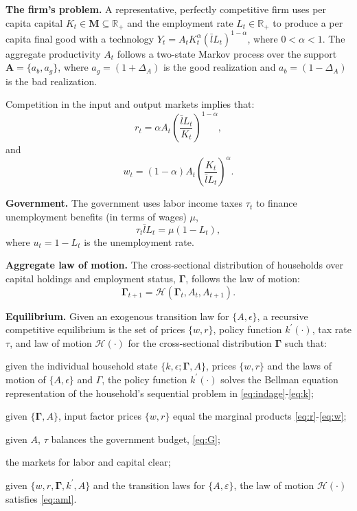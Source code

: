 \documentclass[12pt,american]{article}
\newcommand{\kdis}{\mathbf{\Gamma}}
\newcommand{\Aset}{\mathbf{A}}
\newcommand{\lbar}{\bar{l}}
\newcommand{\Leff}{\lbar L}
\begin{document}
\textbf{The firm's problem.} A representative, perfectly competitive firm uses per capita capital $K_{t}\in\mathbf{M}\subseteq\mathbb{R}_{+}$ and the employment rate $L_{t}\in\mathbb{R}_{+}$ to produce a per capita final good with a technology $Y_{t} = A_{t}K^{\alpha}_{t}(\Leff_{t})^{1-\alpha}$, where $0<\alpha<1$. The aggregate productivity $A_{t}$ follows a two-state Markov process over the support $\Aset=\{a_b,a_g\}$, where $a_{g}=(1+\Delta_{A})$ is the good realization and $a_{b}=(1-\Delta_{A})$ is the bad realization.

Competition in the input and output markets implies that:
\begin{equation}
r_{t} =  \alpha A_{t}\left(\frac{\Leff_{t}}{K_{t}}\right)^{1-\alpha},\label{eq:r}
\end{equation}
and
\begin{equation}
w_{t} = (1-\alpha) A_{t}\left(\frac{K_{t}}{\Leff_{t}}\right)^{\alpha}\label{eq:w}.
\end{equation}

\textbf{Government.} The government uses labor income taxes $\tau_{t}$ to finance unemployment benefits (in terms of wages) $\mu$,
\begin{equation}
\tau_{t}  \Leff_{t}  = \mu (1-L_{t}),\label{eq:G}
\end{equation}
where $u_{t}=1-L_{t}$ is the unemployment rate.

\textbf{Aggregate law of motion.} The cross-sectional distribution of households over capital holdings and employment status, $\kdis$, follows the law of motion:
\begin{equation}
\kdis_{t+1}=\mathcal{H}(\kdis_{t},A_{t},A_{t+1}).\label{eq:aml}
\end{equation}

\textbf{Equilibrium.} Given an exogenous transition law for $\{A,\epsilon\}$, a recursive competitive equilibrium is the set of prices $\{w,r\}$, policy function $k^{\prime}(\cdot)$, tax rate $\tau$, and law of motion $\mathcal{H}(\cdot)$ for the cross-sectional distribution $\kdis$ such that:
\begin{inparaenum}[i)]
\item given the individual household state $\{k,\epsilon;\kdis,A\}$, prices $\{w,r\}$ and the laws of motion of $\{A,\epsilon\}$ and $\Gamma$, the policy function $k^{\prime}(\cdot)$ solves the Bellman equation representation of the household's sequential problem in \eqref{eq:indage}-\eqref{eq:k};
\item given $\{\kdis,A\}$, input factor prices $\{w,r\}$ equal the marginal products \eqref{eq:r}-\eqref{eq:w};
\item given $A$, $\tau$ balances the government budget, \eqref{eq:G};
\item the markets for labor and capital clear;
\item given $\{w,r,\kdis,k^{\prime},A\}$ and the transition laws for $\{A,\varepsilon\}$, the law of motion $\mathcal{H}(\cdot)$ satisfies \eqref{eq:aml}.
\end{inparaenum}
\end{document}
